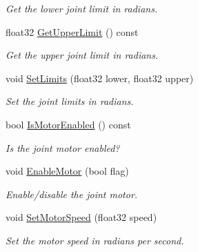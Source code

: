 \begin{DoxyCompactItemize}
\begin{DoxyCompactList}\small\item\em Get the lower joint limit in radians. \end{DoxyCompactList}\item 
\mbox{\label{classb2_revolute_joint_a5c30cf83116841607d4d819985732efb}} 
float32 \hyperlink{classb2_revolute_joint_a5c30cf83116841607d4d819985732efb}{Get\+Upper\+Limit} () const
\begin{DoxyCompactList}\small\item\em Get the upper joint limit in radians. \end{DoxyCompactList}\item 
\mbox{\label{classb2_revolute_joint_a32f9393d8a6b993fd523f0f643c28107}} 
void \hyperlink{classb2_revolute_joint_a32f9393d8a6b993fd523f0f643c28107}{Set\+Limits} (float32 lower, float32 upper)
\begin{DoxyCompactList}\small\item\em Set the joint limits in radians. \end{DoxyCompactList}\item 
\mbox{\label{classb2_revolute_joint_a37d5744e89991ebe01b974c4d15a21b5}} 
bool \hyperlink{classb2_revolute_joint_a37d5744e89991ebe01b974c4d15a21b5}{Is\+Motor\+Enabled} () const
\begin{DoxyCompactList}\small\item\em Is the joint motor enabled? \end{DoxyCompactList}\item 
\mbox{\label{classb2_revolute_joint_a80ed5a07d9a0e07d010808a73ffae6ff}} 
void \hyperlink{classb2_revolute_joint_a80ed5a07d9a0e07d010808a73ffae6ff}{Enable\+Motor} (bool flag)
\begin{DoxyCompactList}\small\item\em Enable/disable the joint motor. \end{DoxyCompactList}\item 
\mbox{\label{classb2_revolute_joint_a56f60bb1ea69048c8a455da49d62bf65}} 
void \hyperlink{classb2_revolute_joint_a56f60bb1ea69048c8a455da49d62bf65}{Set\+Motor\+Speed} (float32 speed)
\begin{DoxyCompactList}\small\item\em Set the motor speed in radians per second. \end{DoxyCompactList}\item 

\end{DoxyCompactItemize}
